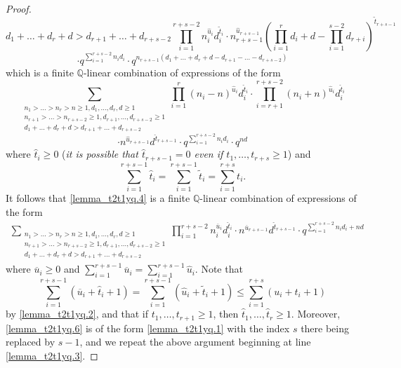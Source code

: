 \documentclass[10pt,a4paper]{amsart}
\newcommand{\Q}{ \mathbb Q }
\newcommand{\w}{\tilde}
\begin{document}
\begin{proof}
$${{    d_1+ \ldots + d_r + d > d_{r+1} + \ldots + d_{r+s-2}}}
    \prod_{i=1}^{r+s-2} n_i^{\hat u_i}d_i^{\w t_i} \cdot 
    n_{r+s-1}^{\hat u_{r+s-1}} \left (\prod_{i=1}^{r} 
    d_i + d - \prod_{i=1}^{s-2} d_{r+i} \right )^{\w t_{r+s-1}}
$$
$$
\cdot q^{\sum_{i=1}^{r+s-2} n_i d_i}
\cdot q^{n_{r+s-1} (d_1+ \ldots + d_r + d - d_{r+1} - \ldots - d_{r+s-2})}
$$
which is a finite $\Q$-linear combination of expressions of the form
$$
\sum_{\substack{n_1 > \ldots > n_r > n \ge 1, d_1, \ldots, d_r, d \ge 1\\
    n_{r+1} > \ldots > n_{r+s-2} \ge 1, d_{r+1}, \ldots, d_{r+s-2} \ge 1\\
    d_1+ \ldots + d_r + d > d_{r+1} + \ldots + d_{r+s-2}}}
    \prod_{i=1}^{r} (n_i-n)^{\hat u_i}d_i^{\hat t_i} \cdot 
    \prod_{i=r+1}^{r+s-2} (n_i+n)^{\hat u_i}d_i^{\hat t_i} 
$$
$$
\cdot n^{\hat u_{r+s-1}} d^{\hat t_{r+s-1}}
\cdot q^{\sum_{i=1}^{r+s-2} n_i d_i} \cdot q^{nd}
$$
where $\hat t_i \ge 0$ ({\it it is possible that $\hat t_{r+s-1}=0$ 
even if $t_1, \ldots, t_{r+s} \ge 1$}) and 
$$
  \sum_{i=1}^{r+s-1} \hat t_i = \sum_{i=1}^{r+s-1} \w t_i 
= \sum_{i=1}^{r+s} t_i. 
$$
It follows that \eqref{lemma_t2t1yq.4} 
is a finite $\Q$-linear combination of expressions of the form
\begin{eqnarray}  \label{lemma_t2t1yq.6}
\sum_{\substack{n_1 > \ldots > n_r > n \ge 1, d_1, \ldots, d_r, d \ge 1\\
    n_{r+1} > \ldots > n_{r+s-2} \ge 1, d_{r+1}, \ldots, d_{r+s-2} \ge 1\\
    d_1+ \ldots + d_r + d > d_{r+1} + \ldots + d_{r+s-2}}}
    \prod_{i=1}^{r+s-2} n_i^{\overline u_i}d_i^{\hat t_i} \cdot 
    n^{\overline u_{r+s-1}} d^{\hat t_{r+s-1}}
    \cdot q^{\sum_{i=1}^{r+s-2} n_i d_i + nd}
\end{eqnarray} 
where $\overline u_i \ge 0$ and $\sum_{i=1}^{r+s-1} \overline u_i 
= \sum_{i=1}^{r+s-1} \hat u_i$. Note that 
$$
    \sum_{i=1}^{r+s-1} (\overline u_i + \hat t_i + 1)  
= \sum_{i=1}^{r+s-1} (\hat u_i + \w t_i + 1)    
\le \sum_{i=1}^{r+s} (u_i + t_i + 1)
$$
by \eqref{lemma_t2t1yq.2}, and that if $t_1, \ldots, t_{r+1} \ge 1$, 
then $\hat t_1, \ldots, \hat t_{r} \ge 1$. Moreover, 
\eqref{lemma_t2t1yq.6} is of the form \eqref{lemma_t2t1yq.1} 
with the index $s$ there being replaced by $s-1$,
and we repeat the above argument beginning at line \eqref{lemma_t2t1yq.3}.


\end{proof}
\end{document}
